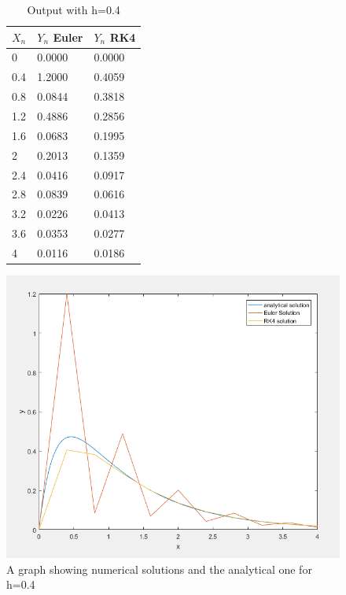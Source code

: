 \documentclass[10pt,a4paper]{report}
\begin{document}
\begin{figure}[ht]
\begin{minipage}[b]{0.3\linewidth}


\begin{table}[H]
\centering
\begin{tabular}{|l|l|l|}
\hline


$X_n$ & $Y_n$ Euler & $Y_n$ RK4 \\ \hline
0    & 0.0000     & 0.0000   \\ \hline
0.4  & 1.2000     & 0.4059   \\ \hline
0.8  & 0.0844     & 0.3818   \\ \hline
1.2  & 0.4886     & 0.2856   \\ \hline
1.6  & 0.0683     & 0.1995   \\ \hline
2    & 0.2013     & 0.1359   \\ \hline
2.4  & 0.0416     & 0.0917   \\ \hline
2.8  & 0.0839     & 0.0616   \\ \hline
3.2  & 0.0226     & 0.0413   \\ \hline
3.6  & 0.0353     & 0.0277   \\ \hline
4    & 0.0116     & 0.0186   \\ \hline
\end{tabular}


\caption{Output with h=0.4}
\end{table}

\vspace{2cm}
\end{minipage}
\hspace{0.5cm}
\begin{minipage}[b]{0.6\linewidth}
\centering
\includegraphics[width=\textwidth]{q3}
\caption{A graph showing numerical solutions and the analytical one for h=0.4}

\end{minipage}
\end{figure}
\end{document}
